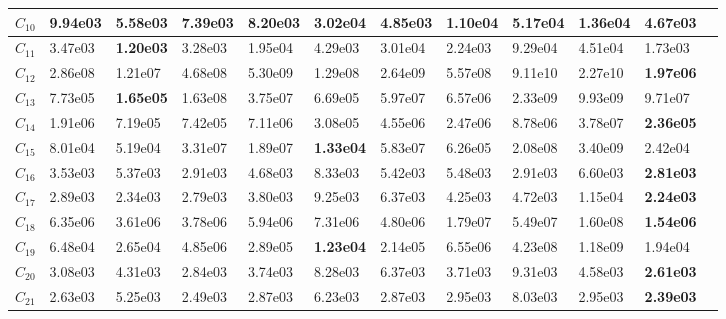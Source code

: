\begin{table}[h]
\begin{center}
\begin{tabular}{p{0.3in} | p{0.44in} | p{0.4in} |  p{0.5in} |  p{0.4in}|  p{0.5in} |  p{0.4in} | p{0.4in} |  p{0.4in} | p{0.4in} |  p{0.4in} |  p{0.4in}}
$C_{10}$     &    9.94e03    &    5.58e03    &    7.39e03    &    8.20e03    &    3.02e04    &    4.85e03    &    1.10e04    &    5.17e04    &    1.36e04    &    \textbf{4.67e03 }\\
\hline
$C_{11}$     &    3.47e03    &    \textbf{1.20e03 }    &    3.28e03    &    1.95e04    &    4.29e03    &    3.01e04    &    2.24e03    &    9.29e04    &    4.51e04    &     1.73e03 \\
$C_{12}$     &    2.86e08    &    1.21e07    &    4.68e08    &    5.30e09    &    1.29e08    &    2.64e09    &    5.57e08    &    9.11e10    &    2.27e10    &    \textbf{1.97e06 }\\
$C_{13}$     &    7.73e05    &    \textbf{1.65e05 }    &    1.63e08    &    3.75e07    &    6.69e05    &    5.97e07    &    6.57e06    &    2.33e09    &    9.93e09    &     9.71e07 \\
$C_{14}$     &    1.91e06    &    7.19e05    &    7.42e05    &    7.11e06    &    3.08e05    &    4.55e06    &    2.47e06    &    8.78e06    &    3.78e07    &    \textbf{2.36e05 }\\
$C_{15}$     &    8.01e04    &    5.19e04    &    3.31e07    &    1.89e07    &    \textbf{1.33e04}    &    5.83e07    &    6.26e05    &    2.08e08    &    3.40e09    &     2.42e04 \\
$C_{16}$     &    3.53e03    &    5.37e03    &    2.91e03    &    4.68e03    &    8.33e03    &    5.42e03    &    5.48e03    &    2.91e03    &    6.60e03    &    \textbf{2.81e03 }\\
$C_{17}$     &    2.89e03    &    2.34e03    &    2.79e03    &    3.80e03    &    9.25e03    &    6.37e03    &    4.25e03    &    4.72e03    &    1.15e04    &    \textbf{2.24e03 }\\
$C_{18}$     &    6.35e06    &    3.61e06    &    3.78e06    &    5.94e06    &    7.31e06    &    4.80e06    &    1.79e07    &    5.49e07    &    1.60e08    &    \textbf{1.54e06 }\\
$C_{19}$     &    6.48e04    &    2.65e04    &    4.85e06    &    2.89e05    &    \textbf{1.23e04}    &    2.14e05    &    6.55e06    &    4.23e08    &    1.18e09    &     1.94e04 \\
$C_{20}$     &    3.08e03    &    4.31e03    &    2.84e03    &    3.74e03    &    8.28e03    &    6.37e03    &    3.71e03    &    9.31e03    &    4.58e03    &    \textbf{2.61e03 }\\
\hline
$C_{21}$     &    2.63e03    &    5.25e03    &    2.49e03    &    2.87e03    &    6.23e03    &    2.87e03    &    2.95e03    &    8.03e03    &    2.95e03    &    \textbf{2.39e03 }\\

\end{tabular}
\end{center}
\end{table}
